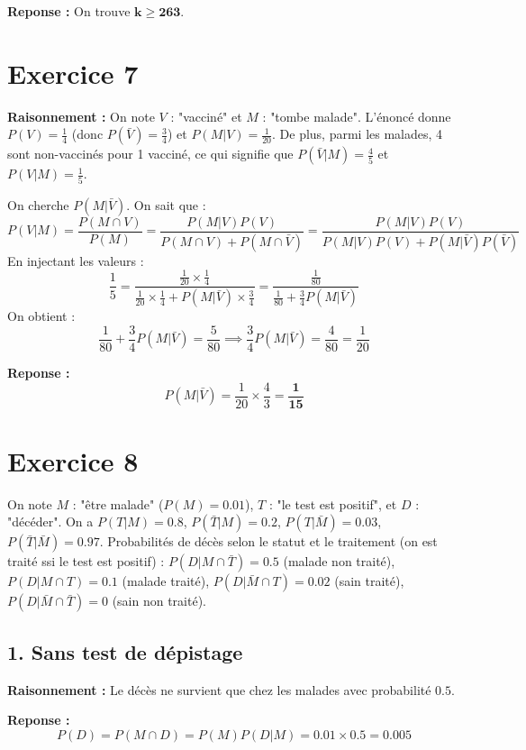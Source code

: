\documentclass[11pt,a4paper]{article}
\begin{document}
\textbf{Reponse :} On trouve $\mathbf{k \ge 263}$.

\hrulefill

\section*{Exercice 7}

\textbf{Raisonnement :} On note $V$ : "vacciné" et $M$ : "tombe malade".
L'énoncé donne $P(V) = \frac{1}{4}$ (donc $P(\bar{V}) = \frac{3}{4}$) et $P(M|V) = \frac{1}{20}$.
De plus, parmi les malades, 4 sont non-vaccinés pour 1 vacciné, ce qui signifie que $P(\bar{V}|M) = \frac{4}{5}$ et $P(V|M) = \frac{1}{5}$.

On cherche $P(M|\bar{V})$.
On sait que :
$$ P(V|M) = \frac{P(M \cap V)}{P(M)} = \frac{P(M|V)P(V)}{P(M \cap V) + P(M \cap \bar{V})} = \frac{P(M|V)P(V)}{P(M|V)P(V) + P(M|\bar{V})P(\bar{V})} $$
En injectant les valeurs : 
$$ \frac{1}{5} = \frac{\frac{1}{20} \times \frac{1}{4}}{\frac{1}{20} \times \frac{1}{4} + P(M|\bar{V}) \times \frac{3}{4}} = \frac{\frac{1}{80}}{\frac{1}{80} + \frac{3}{4}P(M|\bar{V})} $$
On obtient : 
$$ \frac{1}{80} + \frac{3}{4}P(M|\bar{V}) = \frac{5}{80} \implies \frac{3}{4}P(M|\bar{V}) = \frac{4}{80} = \frac{1}{20} $$

\textbf{Reponse :} 
$$ P(M|\bar{V}) = \frac{1}{20} \times \frac{4}{3} = \mathbf{\frac{1}{15}} $$

\hrulefill

\section*{Exercice 8}

On note $M$ : "être malade" ($P(M) = 0.01$), $T$ : "le test est positif", et $D$ : "décéder".
On a $P(T|M) = 0.8$, $P(\bar{T}|M) = 0.2$, $P(T|\bar{M}) = 0.03$, $P(\bar{T}|\bar{M}) = 0.97$.
Probabilités de décès selon le statut et le traitement (on est traité ssi le test est positif) :
$P(D|M \cap \bar{T}) = 0.5$ (malade non traité), $P(D|M \cap T) = 0.1$ (malade traité), $P(D|\bar{M} \cap T) = 0.02$ (sain traité), $P(D|\bar{M} \cap \bar{T}) = 0$ (sain non traité).

\subsection*{1. Sans test de dépistage}

\textbf{Raisonnement :} Le décès ne survient que chez les malades avec probabilité $0.5$.

\textbf{Reponse :} 
$$ P(D) = P(M \cap D) = P(M)P(D|M) = 0.01 \times 0.5 = \mathbf{0.005} $$
\end{document}
